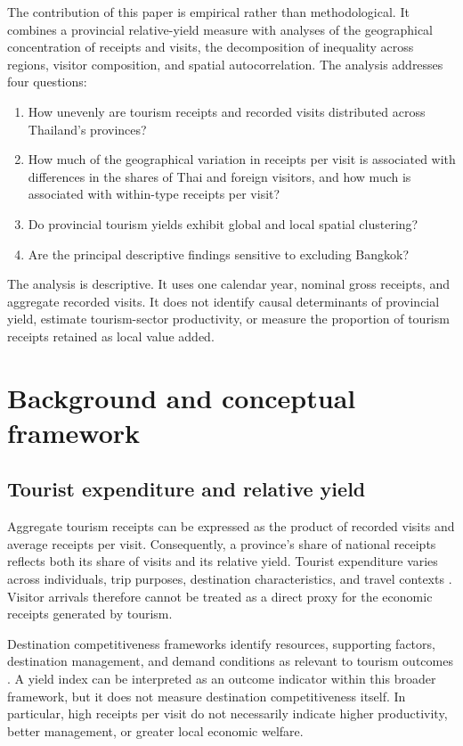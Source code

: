 \documentclass[11pt,a4paper]{article}
\begin{document}
The contribution of this paper is empirical rather than methodological. It combines a provincial relative-yield measure with analyses of the geographical concentration of receipts and visits, the decomposition of inequality across regions, visitor composition, and spatial autocorrelation. The analysis addresses four questions:
\begin{enumerate}
\item How unevenly are tourism receipts and recorded visits distributed across Thailand's provinces?
\item How much of the geographical variation in receipts per visit is associated with differences in the shares of Thai and foreign visitors, and how much is associated with within-type receipts per visit?
\item Do provincial tourism yields exhibit global and local spatial clustering?
\item Are the principal descriptive findings sensitive to excluding Bangkok?
\end{enumerate}
The analysis is descriptive. It uses one calendar year, nominal gross receipts, and aggregate recorded visits. It does not identify causal determinants of provincial yield, estimate tourism-sector productivity, or measure the proportion of tourism receipts retained as local value added.

\section{Background and conceptual framework}
\subsection{Tourist expenditure and relative yield}
Aggregate tourism receipts can be expressed as the product of recorded visits and average receipts per visit. Consequently, a province's share of national receipts reflects both its share of visits and its relative yield. Tourist expenditure varies across individuals, trip purposes, destination characteristics, and travel contexts \citep{wang2010,brida2013}. Visitor arrivals therefore cannot be treated as a direct proxy for the economic receipts generated by tourism.

Destination competitiveness frameworks identify resources, supporting factors, destination management, and demand conditions as relevant to tourism outcomes \citep{dwyer2003}. A yield index can be interpreted as an outcome indicator within this broader framework, but it does not measure destination competitiveness itself. In particular, high receipts per visit do not necessarily indicate higher productivity, better management, or greater local economic welfare.
\end{document}
